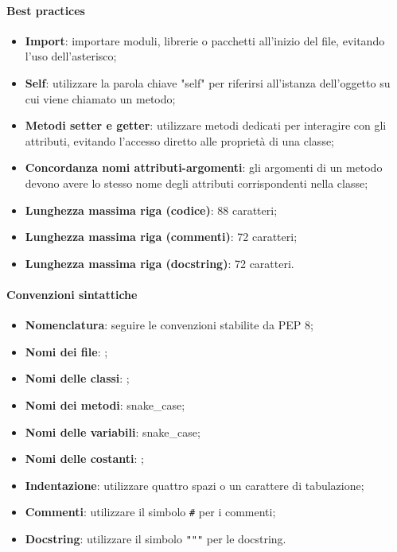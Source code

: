\paragraph*{Best practices}
\begin{itemize}
  \item \textbf{Import}: importare moduli, librerie o pacchetti all'inizio del file, evitando l'uso dell'asterisco;
  \item \textbf{Self}: utilizzare la parola chiave "self" per riferirsi all'istanza dell'oggetto su cui viene chiamato un metodo;
  \item \textbf{Metodi setter e getter}: utilizzare metodi dedicati per interagire con gli attributi, evitando l'accesso diretto alle proprietà di una classe;
  \item \textbf{Concordanza nomi attributi-argomenti}: gli argomenti di un metodo devono avere lo stesso nome degli attributi corrispondenti nella classe;
  \item \textbf{Lunghezza massima riga (codice)}: 88 caratteri;
  \item \textbf{Lunghezza massima riga (commenti)}: 72 caratteri;
  \item \textbf{Lunghezza massima riga (docstring)}: 72 caratteri.
\end{itemize}

\paragraph*{Convenzioni sintattiche}
\begin{itemize}
  \item \textbf{Nomenclatura}: seguire le convenzioni stabilite da PEP 8;
  \item \textbf{Nomi dei file}: ;
  \item \textbf{Nomi delle classi}: ;
  \item \textbf{Nomi dei metodi}: snake\_case;
  \item \textbf{Nomi delle variabili}: snake\_case;
  \item \textbf{Nomi delle costanti}: ;
  \item \textbf{Indentazione}: utilizzare quattro spazi o un carattere di tabulazione;
  \item \textbf{Commenti}: utilizzare il simbolo \verb|#| per i commenti;
  \item \textbf{Docstring}: utilizzare il simbolo \verb|"""| per le docstring.
\end{itemize}

